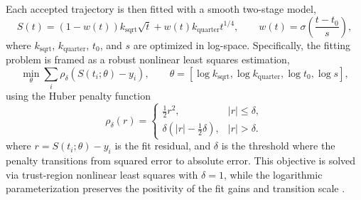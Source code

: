 Each accepted trajectory is then fitted with a smooth two-stage model,
\[
S(t)=\left(1-w(t)\right)k_{\mathrm{sqrt}}\sqrt{t}
+w(t)k_{\mathrm{quarter}}t^{1/4},
\qquad
w(t)=\sigma\!\left(\frac{t-t_0}{s}\right),
\]
where \(k_{\mathrm{sqrt}}\), \(k_{\mathrm{quarter}}\), \(t_0\), and \(s\) are optimized in log-space. Specifically, the fitting problem is framed as a robust nonlinear least squares estimation,
\[
\min_{\theta}
\sum_i \rho_\delta\!\left(S(t_i;\theta)-y_i\right),
\qquad
\theta=
\left[\log k_{\mathrm{sqrt}},\log k_{\mathrm{quarter}},\log t_0,\log s\right],
\]
using the Huber penalty function
\[
\rho_\delta(r)=
\begin{cases}
\tfrac{1}{2}r^2, & |r|\le \delta,\\
\delta\left(|r|-\tfrac{1}{2}\delta\right), & |r|>\delta.
\end{cases}
\]
where \(r = S(t_i;\theta)-y_i\) is the fit residual, and \(\delta\) is the threshold where the penalty transitions from squared error to absolute error. This objective is solved via trust-region nonlinear least squares with \(\delta=1\), while the logarithmic parameterization preserves the positivity of the fit gains and transition scale \cite{Huber1964,NocedalWright2006}.

